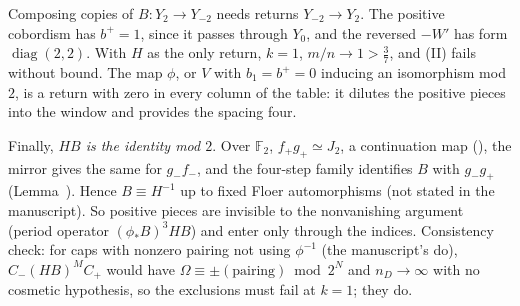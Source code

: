 \documentclass[10pt]{amsart}
\newcommand{\F}{\mathbb F}\newcommand{\CP}{\mathbb{CP}}\newcommand{\CPb}{\overline{\mathbb{CP}}{}^2}
\begin{document}
Composing copies of $B\colon Y_2\to Y_{-2}$ needs returns $Y_{-2}\to Y_2$. The positive cobordism has $b^+=1$, since it passes through $Y_0$, and the reversed $-W'$ has form $\operatorname{diag}(2,2)$. With $H$ as the only return, $k=1$, $m/n\to1>\frac37$, and (II) fails without bound. The map $\phi$, or $V$ with $b_1=b^+=0$ inducing an isomorphism mod $2$, is a return with zero in every column of the table: it dilutes the positive pieces into the window and provides the spacing four.

Finally, \emph{$HB$ is the identity mod $2$}. Over $\F_2$, $f_+g_+\simeq J_2$, a continuation map (), the mirror gives the same for $g_-f_-$, and the four-step family identifies $B$ with $g_-g_+$ (Lemma~). Hence $B\equiv H^{-1}$ up to fixed Floer automorphisms (not stated in the manuscript). So positive pieces are invisible to the nonvanishing argument (period operator $(\phi_*B)^3HB$) and enter only through the indices. Consistency check: for caps with nonzero pairing not using $\phi^{-1}$ (the manuscript's do), $C_-(HB)^MC_+$ would have $\Omega\equiv\pm(\text{pairing})\bmod 2^N$ and $n_D\to\infty$ with no cosmetic hypothesis, so the exclusions must fail at $k=1$; they do.
\end{document}
